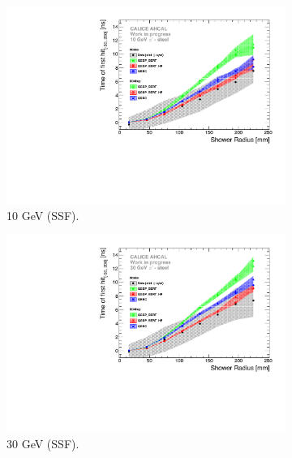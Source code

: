 \begin{figure}[htbp!]
	\begin{subfigure}[t]{0.5\textwidth}
		\centering
		\includegraphics[width=1\textwidth]{chap5/fig_AHCAL_timing/Pions/ComparisonToSim/Time_Radius_10GeV_SSF.pdf}
		\caption{10 GeV (SSF).} \label{fig:Radius_SSF_SimData_10GeV}
	\end{subfigure}
	\hfill
	\begin{subfigure}[t]{0.5\textwidth}
		\centering
		\includegraphics[width=1\textwidth]{chap5/fig_AHCAL_timing/Pions/ComparisonToSim/Time_Radius_30GeV_SSF.pdf}
		\caption{30 GeV (SSF).} \label{fig:Radius_SSF_SimData_30GeV}
	\end{subfigure}
	\hfill
	\begin{subfigure}[t]{0.5\textwidth}
		\centering

\end{subfigure}
\end{figure}
